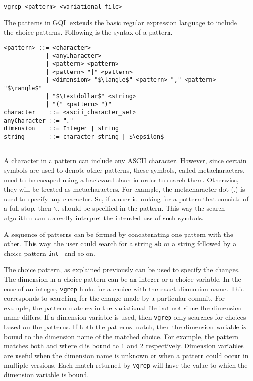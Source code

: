 \begin{lstlisting}
vgrep <pattern> <variational_file>
\end{lstlisting}

The patterns in GQL extends the basic regular expression language to include the choice patterns. Following is the syntax of a pattern.

\begin{lstlisting}
<pattern> ::= <character>  
            | <anyCharacter>
            | <pattern> <pattern>
            | <pattern> "|" <pattern>
            | <dimension> "$\langle$" <pattern> "," <pattern> "$\rangle$"
            | "$\textdollar$" <string>
            | "(" <pattern> ")"
character    ::= <ascii_character_set>
anyCharacter ::= "."
dimension    ::= Integer | string
string       ::= character string | $\epsilon$


\end{lstlisting}

A character in a pattern can include any ASCII character. However, since certain symbols are used to denote other patterns, these symbols, called metacharacters, need to be escaped using a backward slash in order to search them. Otherwise, they will be treated as metacharacters. For example, the metacharacter dot (.) is used to specify any character. So, if a user is looking for a pattern that consists of a full stop, then $\backslash$. should be specified in the pattern. This way the search algorithm can correctly interpret the intended use of such symbols.

A sequence of patterns can be formed by concatenating one pattern with the other. This way, the user could search for a string \texttt{ab} or a string followed by a choice pattern \texttt{int } and so on.

The choice pattern, as explained previously can be used to specify the changes. The dimension in a choice pattern can be an integer or a choice variable. In the case of an integer, \texttt{vgrep} looks for a choice with the exact dimension name. This corresponds to searching for the change made by a particular commit. For example, the pattern  matches  in the variational file but not  since the dimension name differs. If a dimension variable is used, then \texttt{vgrep} only searches for choices based on the patterns. If both the patterns match, then the dimension variable is bound to the dimension name of the matched choice. For example, the pattern  matches both  and  where d is bound to 1 and 2 respectively. Dimension variables are useful when the dimension name is unknown or when a pattern could occur in multiple versions. Each match returned by \texttt{vgrep} will have the value to which the dimension variable is bound.
{}

